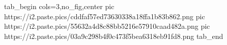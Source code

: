  
 
 
 
 


\ifcmt
  tab_begin cols=3,no_fig,center
		pic https://i2.paste.pics/cddfaf57ed73630338a18ffa1b83b862.png
		pic https://i2.paste.pics/55632a4d8c88bb5216e57910caad482a.png
		pic https://i2.paste.pics/03a9c298b4f0c473f5bea6318eb91fd8.png
  tab_end
\fi
